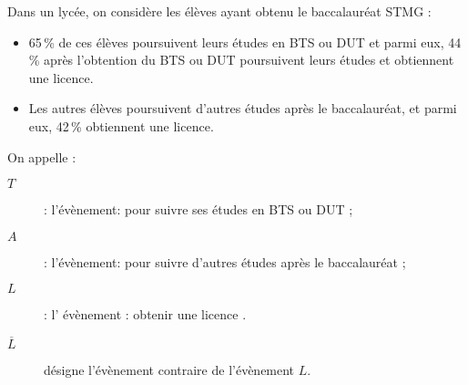 \documentclass[12pt,%
addpoints,%
]{exam}
\def\Question{	
	\renewcommand*{\questionlabel}{\fbox{Exercice \thequestion : }}
	\question
}
\def\Part{
	\renewcommand*{\partlabel}{\fbox{\thepartno : }}
	\part
}
\renewenvironment{solution}
{\begingroup\par\parshape0%
\begin{mdframed}[%
                 userdefinedwidth=\textwidth,
                 backgroundcolor=blue!5]
\textbf{Solution:}\enspace\ignorespaces}
{\end{mdframed}\par\endgroup}
\begin{document}
	\begin{questions}
    
        \Question 
			\begin{description}
				\item Dans un lycée, on considère les élèves ayant obtenu le baccalauréat STMG :
					\setlength\parindent{9mm}
					\begin{itemize}[label=\textbullet]
						\item 65\,\% de ces élèves poursuivent leurs études en BTS ou DUT et parmi eux, 44\,\% après l'obtention du BTS ou DUT poursuivent leurs études et obtiennent une licence.
						\item Les autres élèves poursuivent d'autres études après le baccalauréat, et parmi eux, 42\,\% obtiennent une licence.
					\end{itemize}
					\setlength\parindent{0mm}
					On appelle :			
					\begin{description}
						\item[$T$] : l'évènement: \og pour suivre ses études en BTS ou DUT\fg{} ;
						\item[$A$] : l'évènement: \og pour suivre d'autres études après le baccalauréat\fg{} ; 
						\item[$L$] : l' évènement : \og obtenir une licence \fg.
						\item[$\overline{L}$]  désigne l'évènement contraire de l'évènement $L$.
					\end{description}
			\end{description}
			\vspace{0.25cm}
\end{questions}
\end{document}
